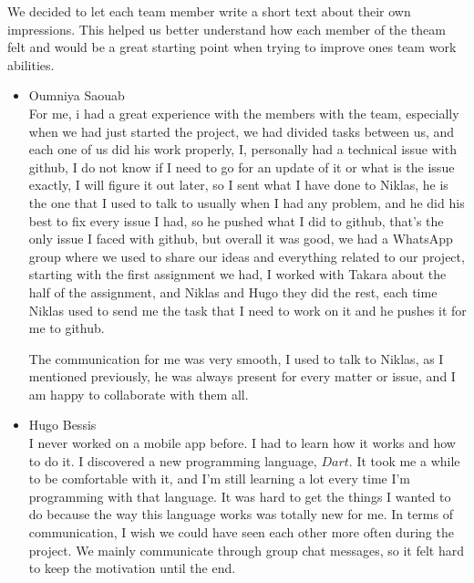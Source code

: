 \documentclass[10pt]{article}
\begin{document}
\begin{multicols*}{2}
We decided to let each team member write a short text about their own impressions. This helped us better understand how each member of the theam felt and would be a great starting point when trying to improve ones team work abilities.

\begin{itemize}
  \item {Oumniya Saouab}\\
  For me, i had a great experience with the members with the team, especially when we had just started the project, we had divided tasks between us, and each one of us did his work properly, I, personally had a technical issue with github, I do not know if I need to go for an update of it or what is the issue exactly, I will figure it out later, so I sent what I have done to Niklas, he is the one that I used to talk to usually when I had any problem, and he did his best to fix every issue I had, so he pushed what I did to github, that’s the only issue I faced with github, but overall it was good, we had a WhatsApp group where we used to share our ideas and everything related to our project, starting with the first assignment we had, I worked with Takara about the half of the assignment, and Niklas and Hugo they did the rest, each time Niklas used to send me the task that I need to work on it and he pushes it for me to github. 
  
  The communication for me was very smooth, I used to talk to Niklas, as I mentioned previously, he was always present for every matter or issue, and I am happy to collaborate with them all. 

  \item {Hugo Bessis}\\
  I never worked on a mobile app before. I had to learn how it works and how to do it. I discovered a new programming language, $Dart$. It took me a while to be comfortable with it, and I'm still learning a lot every time I'm programming with that language. It was hard to get the things I wanted to do because the way this language works was totally new for me.
  In terms of communication, I wish we could have seen each other more often during the project. We mainly communicate through group chat messages, so it felt hard to keep the motivation until the end.
  

\end{itemize}
\end{multicols*}
\end{document}
